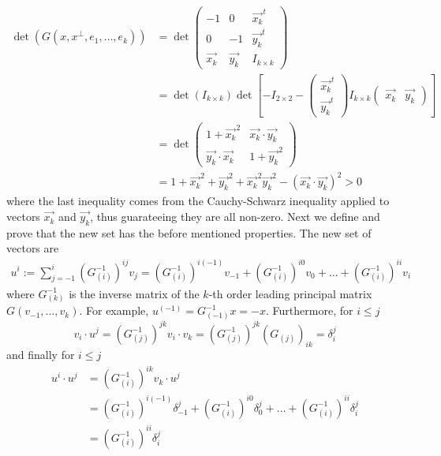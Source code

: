 \documentclass[a4paper,12pt]{article}
\numberwithin{equation}{section}
\numberwithin{thm}{section}
\numberwithin{exm}{section}
\newcommand{\<}{{\langle}}
\renewcommand{\>}{{\rangle}}
\renewcommand{\d}{{\delta}}
\begin{document}
	\begin{align}
	\det(G(x,x^\perp,e_1,\ldots,e_k)) & = \det\left(
		\begin{array}{ccc}
		-1 & 0 & \vec{x_k}^t \\
		0 & -1 & \vec{y_k}^t \\
		\vec{x_k} & \vec{y_k} & I_{k\times k}
		\end{array}
	\right) \nonumber \\
	& = \det(I_{k\times k}) \det\left[ -I_{2\times 2} - \left(
		\begin{array}{c}
		\vec{x_k}^t \\
		\vec{y_k}^t
		\end{array}
	\right) I_{k\times k} \left(
		\begin{array}{cc}
		\vec{x_k} & \vec{y_k}
		\end{array}
	\right)\right] \nonumber \\
	& = \det \left(
		\begin{array}{cc}
		1 + \vec{x_k}^2 & \vec{x_k}\cdot \vec{y_k} \\
		\vec{y_k} \cdot \vec{x_k} & 1 + \vec{y_k}^2
		\end{array}
	\right) \nonumber \\
	& = 1 + \vec{x_k}^2 + \vec{y_k}^2 + \vec{x_k}^2 \vec{y_k}^2 - (\vec{x_k}\cdot\vec{y_k})^2 > 0
	\end{align}
where the last inequality comes from the Cauchy-Schwarz inequality applied to vectors $\vec{x_k}$ and $\vec{y_k}$, thus guarateeing they are all non-zero. Next we define and prove that the new set has the before mentioned properties. The new set of vectors are
	\begin{align}
	u^i := \sum_{j = -1}^i (G^{-1}_{(i)})^{ij}v_j = (G^{-1}_{(i)})^{i(-1)}v_{-1} + (G^{-1}_{(i)})^{i0}v_0 + \ldots + (G^{-1}_{(i)})^{ii}v_i
	\end{align}
where $G^{-1}_{(k)}$ is the inverse matrix of the $k$-th order leading principal matrix $G(v_{-1},\ldots,v_k)$. For example, $u^{(-1)} = G^{-1}_{(-1)} x = -x$. Furthermore, for $i\leq j$
	\begin{equation}
	v_i \cdot u^j = (G^{-1}_{(j)})^{jk} v_i\cdot v_k = (G^{-1}_{(j)})^{jk} (G_{(j)})_{ik} = \d^j_i
	\end{equation}
and finally for $i\leq j$
	\begin{align}
	u^i \cdot u^j & = (G^{-1}_{(i)})^{ik} v_k\cdot u^j \nonumber \\
	& = (G^{-1}_{(i)})^{i(-1)} \d^j_{-1} + (G^{-1}_{(i)})^{i0} \d^j_{0} + \ldots + (G^{-1}_{(i)})^{ii} \d^j_i \nonumber \\
	& = (G^{-1}_{(i)})^{ii} \d^j_i
	\end{align}
\end{document}
